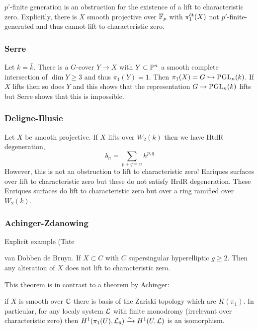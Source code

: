 \documentclass[12pt]{article}
\begin{document}
\begin{theorem}
$p$'-finite generation is an obstruction for the existence of a lift to characteristic zero. Explicitly, there is $X$ smooth projective over $\overline{\FF}_p$ with $\pi_1^{\et}(X)$ not $p'$-finite-generated and thus cannot lift to characteristic zero.
\end{theorem}

\subsubsection{Serre}

Let $k = \bar{k}$. There is a $G$-cover $Y \to X$ with $Y \subset \P^n$ a smooth complete intersection of $\dim{Y} \ge 3$ and thus $\pi_1(Y) = 1$. Then $\pi_1(X) = G \embed \PGL_n(k)$. If $X$ lifts then so does $Y$ and this shows that the representation $G \to \PGL_n(k)$ lifts but Serre shows that this is impossible. 

\subsubsection{Deligne-Illusie}

Let $X$ be smooth projective. If $X$ lifts over $W_2(k)$ then we have HtdR degeneration,
\[ b_n = \sum_{p + q = n} h^{p,q} \]
However, this is not an obstruction to lift to characteristic zero! Enriques surfaces over lift to characteristic zero but these do not satisfy HrdR degeneration. These Enriques surfaces do lift to characteristic zero but over a ring ramified over $W_2(k)$.

\subsubsection{Achinger-Zdanowing}

Explicit example (Tate 

van Dobben de Bruyn. If $X \subset C$ with $C$ supersingular hyperelliptic $g \ge 2$. Then any alteration of $X$ does not lift to characteristic zero. 

This theorem is in contrast to a theorem by Achinger: 

\begin{thm}[Artin]
if $X$ is smooth over $\CC$ there is basis of the Zariski topology which are $K(\pi_1)$. In particular, for any localy system $\L$ with finite monodromy (irrelevant over characteristic zero) then $H^1(\pi_1(U), \L_{\bar{s}}) \iso H^1(U, \L)$ is an isomorphism. 
\end{thm}
\end{document}
